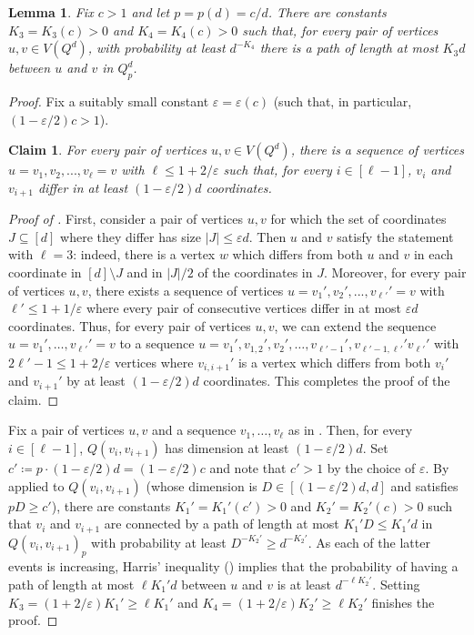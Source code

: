 \documentclass[reqno,final,a4paper]{amsart}
\newtheorem{lemma}[thm]{Lemma}
\newtheorem{claim}[thm]{Claim}
\theoremstyle{definition}
\def\eps{\varepsilon}
\newcommand{\1}{\mathbbm{1}}
\begin{document}
\begin{lemma}\label{lem:bootstrap_7.1}
Fix $c>1$ and let $p=p(d)=c/d$. There are constants $K_3=K_3(c)>0$ and $K_4=K_4(c)>0$ such that, for every pair of vertices $u,v\in V(Q^d)$, with probability at least $d^{-K_4}$ there is a path of length at most $K_3d$ between $u$ and $v$ in $Q^d_p$. 
\end{lemma}
\begin{proof}
Fix a suitably small constant $\eps=\eps(c)$ (such that, in particular, $(1-\eps/2)c>1$). 
\begin{claim}\label{cl:chain}
For every pair of vertices $u,v\in V(Q^d)$, there is a sequence of vertices $u=v_1,v_2,...,v_\ell=v$ with $\ell\leq 1+2/\eps$ such that, for every $i\in [\ell-1]$, $v_i$ and $v_{i+1}$ differ in at least $(1-\eps/2)d$ coordinates. 
\end{claim}
\begin{proof}[Proof of ]
First, consider a pair of vertices $u,v$ for which the set of coordinates $J\subseteq [d]$ where they differ has size $|J|\le \eps d$. 
Then $u$ and $v$ satisfy the statement with $\ell=3$: indeed, there is a vertex $w$ which differs from both $u$ and $v$ in each coordinate in $[d]\setminus J$ and in $|J|/2$ of the coordinates in $J$.  
Moreover, for every pair of vertices $u,v$, there exists a sequence of vertices $u=v_1',v_2',...,v_{\ell'}'=v$ with $\ell'\le 1+1/\eps$ where every pair of consecutive vertices differ in at most $\eps d$ coordinates. 
Thus, for every pair of vertices $u,v$, we can extend the sequence $u=v_1',\ldots, v_{\ell'}'=v$ to a sequence $u=v_1', v_{1,2}', v_2', \ldots,v_{\ell'-1}', v_{\ell'-1,\ell'}'  v_{\ell'}'$ with $2\ell'-1\le 1+2/\eps$ vertices where $v_{i,i+1}'$ is a vertex which differs from both $v_i'$ and $v_{i+1}'$ by at least $(1-\eps/2)d$ coordinates. This completes the proof of the claim.
\end{proof}

Fix a pair of vertices $u,v$ and a sequence $v_1,\ldots,v_\ell$ as in .
Then, for every $i\in [\ell-1]$, $Q(v_i,v_{i+1})$ has dimension at least $(1-\eps/2)d$.
Set $c'\coloneqq p\cdot (1-\eps/2)d =(1-\eps/2)c$ and note that $c'>1$ by the choice of $\eps$. 
By  applied to $Q(v_i,v_{i+1})$ (whose dimension is $D\in [(1-\eps/2)d,d]$ and satisfies $pD\geq c'$), there are constants $K_1'=K_1'(c')>0$ and $K_2'=K_2'(c)>0$ such that $v_i$ and $v_{i+1}$ are connected by a path of length at most $K_1'D\leq K_1'd$ in $Q(v_i,v_{i+1})_p$ with probability at least $D^{-K_2'}\geq d^{-K_2'}$. 
As each of the latter events is increasing, Harris' inequality () implies that the probability of having a path of length at most $\ell K_1' d$ between $u$ and $v$ is at least $d^{-\ell K_2'}$.
Setting $K_3= (1+2/\eps)K_1'\ge \ell K_1'$ and $K_4= (1+2/\eps)K_2'\ge \ell K_2'$ finishes the proof.
\end{proof}
\end{document}
